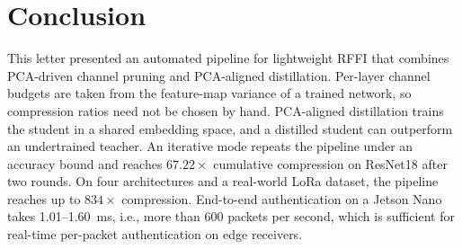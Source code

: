 \documentclass[journal,comsoc]{IEEEtran}
\begin{document}
\section{Conclusion}
\label{sec:conclusion}
This letter presented an automated pipeline for lightweight RFFI that combines PCA-driven channel pruning and PCA-aligned distillation.
Per-layer channel budgets are taken from the feature-map variance of a trained network, so compression ratios need not be chosen by hand.
PCA-aligned distillation trains the student in a shared embedding space, and a distilled student can outperform an undertrained teacher.
An iterative mode repeats the pipeline under an accuracy bound and reaches $67.22\times$ cumulative compression on ResNet18 after two rounds.
On four architectures and a real-world LoRa dataset, the pipeline reaches up to $834\times$ compression.
End-to-end authentication on a Jetson Nano takes 1.01--1.60~ms, i.e., more than 600 packets per second, which is sufficient for real-time per-packet authentication on edge receivers.




\end{document}
